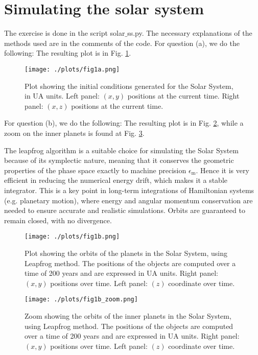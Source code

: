 \section{Simulating the solar system}
The exercise is done in the script solar$\_$ss.py. The necessary explanations of the methods used are in the comments of the code. 
For question (a), we do the following:  
The resulting plot is in Fig. \ref{fig:fig1a}.

\begin{figure}[h!]
    \centering
    \texttt{[image: ./plots/fig1a.png]}
    \caption{Plot showing the initial conditions generated for the Solar System, in UA units. Left panel: $(x,y)$ positions at the current time. Right panel: $(x,z)$ positions at the current time.}
    \label{fig:fig1a}
  \end{figure}

For question (b), 
we do the following: 
The resulting plot is in Fig. \ref{fig:fig1b}, while a zoom on the inner planets is found at Fig. \ref{fig:fig1bzoom}.

The leapfrog algorithm is a suitable choice for simulating the Solar System because of its symplectic nature, meaning that it conserves the geometric properties of the phase space exactly to machine precision $\epsilon_\text{m}$. 
Hence it is very efficient in reducing the numerical energy drift, which makes it a stable integrator. 
This is a key point in long-term integrations of Hamiltonian systems (e.g. planetary motion), where energy and angular momentum conservation are needed to ensure accurate and realistic simulations.
Orbits are guaranteed to remain closed, with no divergence.

\begin{figure}[h!]
    \centering
    \texttt{[image: ./plots/fig1b.png]}
    \caption{Plot showing the orbits of the planets in the Solar System, using Leapfrog method.
    The positions of the objects are computed over a time of 200 years and are expressed in UA units. Right panel: $(x,y)$ positions over time. Left panel: $(z)$ coordinate over time.} 
    \label{fig:fig1b}
  \end{figure}

  \begin{figure}[h!]
    \centering
    \texttt{[image: ./plots/fig1b\_zoom.png]}
    \caption{Zoom showing the orbits of the inner planets in the Solar System, using Leapfrog method.
    The positions of the objects are computed over a time of 200 years and are expressed in UA units. Right panel: $(x,y)$ positions over time. Left panel: $(z)$ coordinate over time.} 
    \label{fig:fig1bzoom}
  \end{figure}

